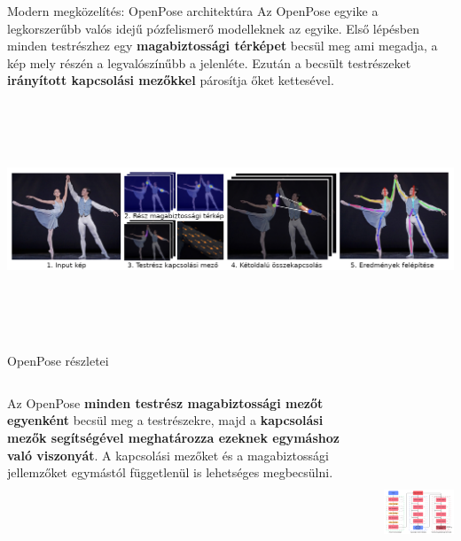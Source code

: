 \documentclass[english, aspectratio=169]{beamer}
\begin{document}
\begin{frame}{Modern megközelítés: OpenPose architektúra}
Az OpenPose egyike a legkorszerűbb valós idejű pózfelismerő modelleknek az egyike. Első lépésben minden testrészhez egy \textbf{magabiztossági térképet} becsül meg ami megadja, a kép mely részén a legvalószínűbb a jelenléte. Ezután a becsült testrészeket \textbf{irányított kapcsolási mezőkkel} párosítja őket kettesével.
\begin{center}
\includegraphics[height=7cm, width=14cm, keepaspectratio]{images/instance_26.png}
\end{center}
\end{frame}

\begin{frame}{OpenPose részletei}
\begin{columns}
\begin{column}{.35\textwidth}
Az OpenPose \textbf{minden testrész magabiztossági mezőt egyenként} becsül meg a testrészekre, majd a \textbf{kapcsolási mezők segítségével meghatározza ezeknek egymáshoz való viszonyát}. A kapcsolási mezőket és a magabiztossági jellemzőket egymástól függetlenül is lehetséges megbecsülni.
\end{column}
\begin{column}{.65\textwidth}
\begin{center}
\includegraphics[height=7cm, width=9.5cm, keepaspectratio]{images/instance_27.png}
\end{center}
\end{column}
\end{columns}
\end{frame}
\end{document}
